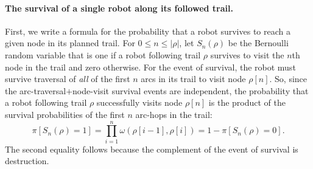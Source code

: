 \documentclass[11pt, oneside]{article}
\begin{document}
\paragraph{The survival of a single robot along its followed trail.} First, we write a formula for the probability that a robot survives to reach a given node in its planned trail.
For $0 \leq n \leq \lvert \rho \rvert$, 
let $S_n(\rho)$ be the Bernoulli random variable that is one if a robot following trail $\rho$ survives to visit the $n$th node in the trail and zero otherwise. For the event of survival, the robot must survive traversal of \emph{all} of the first $n$ arcs in its trail to visit node $\rho[n]$. So, since the arc-traversal$+$node-visit survival events are independent, the probability that a robot following trail $\rho$ successfully visits node $\rho[n]$ is the product of the survival probabilities of the first $n$ arc-hops in the trail:
\begin{equation}
	\pi[S_n(\rho) = 1] = \prod_{i=1}^n \omega(\rho[i-1], \rho[i]) 
	= 1 - \pi[S_n(\rho) = 0]. \label{eq:pi_S_n}
\end{equation} %
The second equality follows because the complement of the event of survival is destruction.

\end{document}
